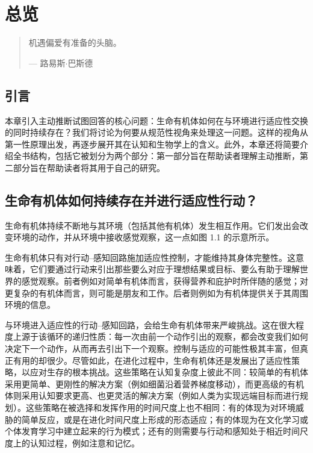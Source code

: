 \chapter{总览}

\begin{quote}
机遇偏爱有准备的头脑。

--- 路易斯$\cdot$巴斯德
\end{quote}

\section{引言}

本章引入主动推断试图回答的核心问题：生命有机体如何在与环境进行适应性交换的同时持续存在？我们将讨论为何要从规范性视角来处理这一问题。这样的视角从第一性原理出发，再逐步展开其在认知和生物学上的含义。此外，本章还将简要介绍全书结构，包括它被划分为两个部分：第一部分旨在帮助读者理解主动推断，第二部分旨在帮助读者将其用于自己的研究。

\section{生命有机体如何持续存在并进行适应性行动？}

生命有机体持续不断地与其环境（包括其他有机体）发生相互作用。它们发出会改变环境的动作，并从环境中接收感觉观察，这一点如图 1.1 的示意所示。

生命有机体只有对行动--感知回路施加适应性控制，才能维持其身体完整性。这意味着，它们要通过行动来引出那些要么对应于理想结果或目标、要么有助于理解世界的感觉观察。前者例如对简单有机体而言，获得营养和庇护时所伴随的感觉；对更复杂的有机体而言，则可能是朋友和工作。后者则例如为有机体提供关于其周围环境的信息。

与环境进入适应性的行动--感知回路，会给生命有机体带来严峻挑战。这在很大程度上源于该循环的递归性质：每一次由前一个动作引出的观察，都会改变我们如何决定下一个动作，从而再去引出下一个观察。控制与适应的可能性极其丰富，但真正有用的却很少。尽管如此，在进化过程中，生命有机体还是发展出了适应性策略，以应对生存的根本挑战。这些策略在认知复杂度上彼此不同：较简单的有机体采用更简单、更刚性的解决方案（例如细菌沿着营养梯度移动），而更高级的有机体则采用认知要求更高、也更灵活的解决方案（例如人类为实现远端目标而进行规划）。这些策略在被选择和发挥作用的时间尺度上也不相同：有的体现为对环境威胁的简单反应，或是在进化时间尺度上形成的形态适应；有的体现为在文化学习或个体发育学习中建立起来的行为模式；还有的则需要与行动和感知处于相近时间尺度上的认知过程，例如注意和记忆。

